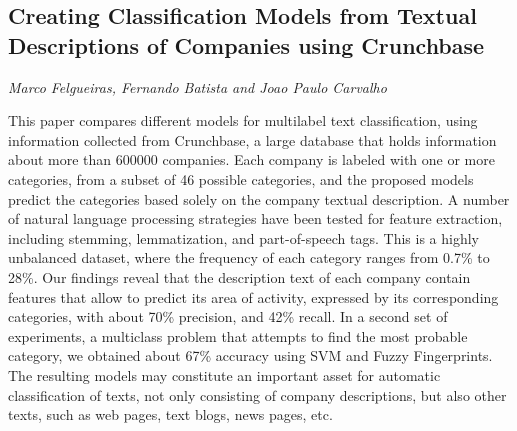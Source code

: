 \documentclass[../booklet.tex]{subfiles}
\begin{document}
\subsection[Creating Classification Models from Textual Descriptions of Companies using Crunchbase. {\it Marco Felgueiras, Fernando Batista and Joao Paulo Carvalho}]{Creating Classification Models from Textual Descriptions of Companies using Crunchbase}
  

\begin{center}
  {\it Marco Felgueiras, Fernando Batista and Joao Paulo Carvalho}
\end{center}

\vskip 0.8cm


This paper compares different models for multilabel text classification, using information collected from Crunchbase, a large data\-base that holds information about more than 600000 companies. Each company is labeled with one or more categories, from a subset of 46 possible categories, and the proposed models predict the categories based solely on the company textual description. A number of natural language processing strategies have been tested for feature extraction, including stemming, lemmatization, and part-of-speech tags. This is a highly unbalanced dataset, where the frequency of each category ranges from 0.7\% to 28\%. Our findings reveal that the description text of each company contain features that allow to predict its area of activity, expressed by its corresponding categories, with about 70\% precision, and 42\% recall. In a second set of experiments, a multiclass problem that attempts to find the most probable category, we obtained about 67\% accuracy using SVM and Fuzzy Fingerprints. The resulting models may constitute an important asset for automatic classification of texts, not only consisting of company descriptions, but also other texts, such as web pages, text blogs, news pages, etc.

\end{document}
